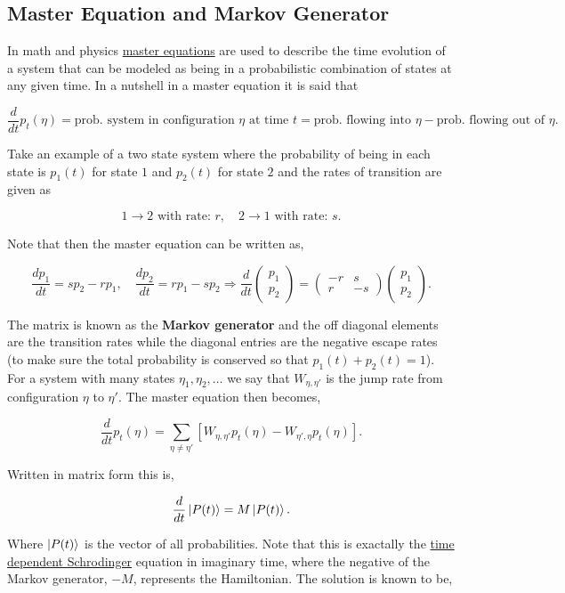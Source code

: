 \documentclass{article}
\begin{document}
\subsection{Master Equation and Markov Generator}

In math and physics \href{https://en.wikipedia.org/wiki/Master_equation}{master equations} are used to describe the time evolution of a system that can be modeled as being in a probabilistic combination of states at any given time. In a nutshell in a master equation it is said that

\[\frac{d}{dt}p_t(\eta) = \text{prob. system in configuration $\eta$ at time $t$} = \text{prob. flowing into $\eta$} - \text{prob. flowing out of $\eta$}.\]

Take an example of a two state system where the probability of being in each state is $p_1(t)$ for state $1$ and $p_2(t)$ for state $2$ and the rates of transition are given as 

\[1 \to 2 \text{ with rate: $r$}, \quad 2\to1 \text{ with rate: $s$}.\]

Note that then the master equation can be written as,

\[\frac{dp_1}{dt} = sp_2 -rp_1, \quad \frac{dp_2}{dt} = rp_1 - sp_2 \Rightarrow \frac{d}{dt}\begin{pmatrix}p_1 \\ p_2 \end{pmatrix} = \begin{pmatrix} -r & s \\ r & -s \end{pmatrix} \begin{pmatrix} p_1 \\ p_2 \end{pmatrix}.\]

The matrix is known as the \textbf{Markov generator} and the off diagonal elements are the transition rates while the diagonal entries are the negative escape rates (to make sure the total probability is conserved so that $p_1(t) + p_2(t) = 1$). For a system with many states $\eta_1, \eta_2, \dots$ we say that $W_{\eta,\eta'}$ is the jump rate from configuration $\eta$ to $\eta'$. The master equation then becomes,

\[\frac{d}{dt}p_t(\eta) = \sum_{\eta\neq \eta'}\left[W_{\eta,\eta'} p_t(\eta) - W_{\eta',\eta}p_t(\eta)\right].\]

Written in matrix form this is,

\[\frac{d}{dt}\ket{P(t)} = M\ket{P(t)}.\]

Where $\ket{P(t)}$ is the vector of all probabilities. Note that this is exactally the \href{https://en.wikipedia.org/wiki/Schr%C3%B6dinger_equation#Time-dependent_equation}{time dependent Schrodinger} equation in imaginary time, where the negative of the Markov generator, $-M$, represents the Hamiltonian. The solution is known to be,
\end{document}
